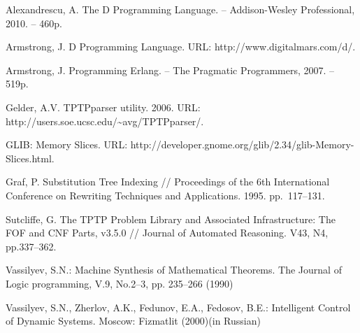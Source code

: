 \documentclass[runningheads,a4paper]{llncs}
\begin{document}
\begin{thebibliography}{4}

 Alexandrescu, A. The D Programming Language. -- Addison-Wesley Professional, 2010. -- 460p.

 Armstrong, J. D Programming Language. URL: http://www.digitalmars.com/d/.

 Armstrong, J. Programming Erlang.  -- The Pragmatic Programmers, 2007. -- 519p.

 Gelder, A.V. TPTPparser utility. 2006. URL: http://users.soe.ucsc.edu/\~{}avg/TPTPparser/.

 GLIB: Memory Slices. URL: http://developer.gnome.org/glib/2.34/glib-Memory-Slices.html.

 Graf, P. Substitution Tree Indexing // Proceedings of the 6th International Conference on Rewriting Techniques and Applications. 1995. pp.~117--131.


 Sutcliffe, G. The TPTP Problem Library and Associated Infrastructure: The FOF and CNF Parts, v3.5.0 // Journal of Automated Reasoning. V43, N4, pp.337--362.

 Vassilyev, S.N.: Machine Synthesis of Mathematical Theorems. The Journal of Logic programming, V.9, No.2--3, pp. 235--266 (1990)

 Vassilyev, S.N., Zherlov, A.K., Fedunov, E.A.,
Fedosov, B.E.: Intelligent Control of Dynamic Systems. Moscow: Fizmatlit (2000)(in Russian)

\end{thebibliography}
\end{document}
